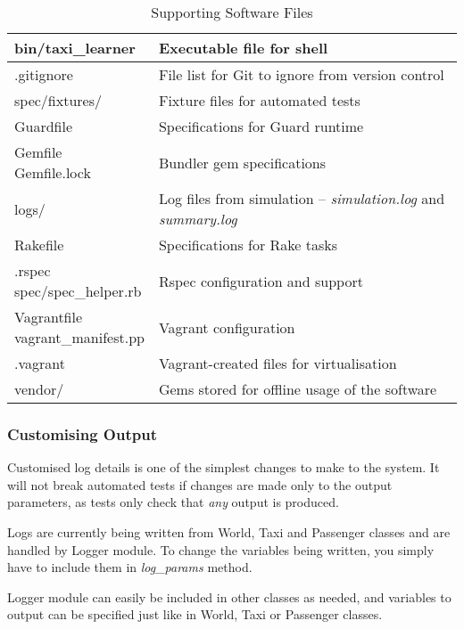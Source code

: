 \begin{table}
\begin{tabular}{| p{} | p{} |}
  \hline
  bin/taxi\_learner & Executable file for shell \\ \hline
  .gitignore & File list for Git to ignore from version control \\ \hline
  spec/fixtures/ & Fixture files for automated tests \\ \hline
  Guardfile & Specifications for Guard runtime \\ \hline
  \specialcell{Gemfile \\ Gemfile.lock} & Bundler gem specifications \\ \hline
  logs/ & Log files from simulation -- \textit{simulation.log} and \textit{summary.log} \\ \hline
  Rakefile & Specifications for Rake tasks \\ \hline
  \specialcell{.rspec \\ spec/spec\_helper.rb}  & Rspec configuration and support \\ \hline
  \specialcell{Vagrantfile \\ vagrant\_manifest.pp} & Vagrant configuration \\ \hline
  .vagrant & Vagrant-created files for virtualisation \\ \hline
  vendor/ & Gems stored for offline usage of the software \\ \hline
\end{tabular}
\caption{
  Supporting Software Files
  \label{table:software:support}
}
\end{table}


\subsubsection{Customising Output}
\label{sec:maintenance_manual:customising_output}

Customised log details is one of the simplest changes to make to the system. It
will not break automated tests if changes are made only to the output
parameters, as tests only check that \textit{any} output is produced.

Logs are currently being written from World, Taxi and Passenger classes and are
handled by Logger module. To change the variables being written, you simply
have to include them in \textit{log\_params} method.

Logger module can easily be included in other classes as needed, and variables
to output can be specified just like in World, Taxi or Passenger classes.


